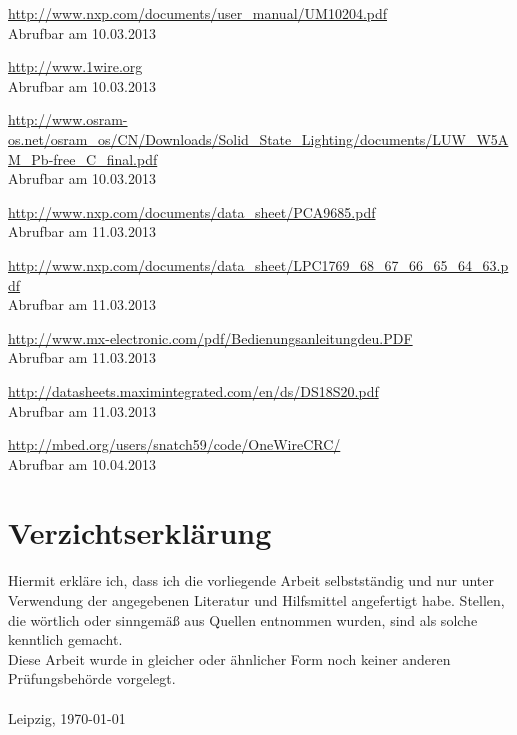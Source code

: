 \documentclass[a4paper,12pt]{scrartcl}
\begin{document}
\renewcommand\refname{}
\begin{thebibliography}{999}

\url{http://www.nxp.com/documents/user_manual/UM10204.pdf}
\\Abrufbar am 10.03.2013

\url{http://www.1wire.org}
\\Abrufbar am 10.03.2013

\url{http://www.osram-os.net/osram_os/CN/Downloads/Solid_State_Lighting/documents/LUW_W5AM_Pb-free_C_final.pdf}
\\Abrufbar am 10.03.2013

\url{http://www.nxp.com/documents/data_sheet/PCA9685.pdf}
\\Abrufbar am 11.03.2013

\url{http://www.nxp.com/documents/data_sheet/LPC1769_68_67_66_65_64_63.pdf}
\\Abrufbar am 11.03.2013

\url{http://www.mx-electronic.com/pdf/Bedienungsanleitungdeu.PDF}
\\Abrufbar am 11.03.2013

\url{http://datasheets.maximintegrated.com/en/ds/DS18S20.pdf}
\\Abrufbar am 11.03.2013

\url{http://mbed.org/users/snatch59/code/OneWireCRC/}
\\Abrufbar am 10.04.2013

\end{thebibliography}

\clearpage
\section{Verzichtserkl\"arung}
\thispagestyle{plain}

Hiermit erkläre ich, dass ich die vorliegende Arbeit selbstständig und nur unter Verwendung der angegebenen Literatur und Hilfsmittel angefertigt habe.
Stellen, die wörtlich oder sinngemäß aus Quellen entnommen wurden, sind als solche
kenntlich gemacht.\\

Diese Arbeit wurde in gleicher oder ähnlicher Form noch keiner anderen Prüfungsbehörde vorgelegt.\\\\

Leipzig, \today
\end{document}
